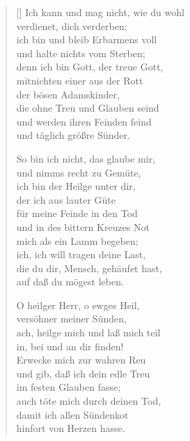 \begin{multicols}{2}
\begin{verse}[\versewidth]
 Ich kann und mag nicht, wie du wohl\\
verdienet, dich verderben;\\
ich bin und bleib Erbarmens voll\\
und halte nichts vom Sterben;\\
denn ich bin Gott, der treue Gott,\\
mitnichten einer aus der Rott\\
der bösen Adamskinder,\\
die ohne Treu und Glauben seind\\
und werden ihren Feinden feind\\
und täglich größre Sünder.

 So bin ich nicht, das glaube mir,\\
und nimms recht zu Gemüte,\\
ich bin der Heilge unter dir,\\
der ich aus lauter Güte\\
für meine Feinde in den Tod\\
und in des bittern Kreuzes Not\\
mich als ein Lamm begeben;\\
ich, ich will tragen deine Last,\\
die du dir, Mensch, gehäufet hast,\\
auf daß du mögest leben.

 O heilger Herr, o ewges Heil,\\
versöhner meiner Sünden,\\
ach, heilge mich und laß mich teil\\
in, bei und an dir finden!\\
Erwecke mich zur wahren Reu\\
und gib, daß ich dein edle Treu\\
im festen Glauben fasse;\\
auch töte mich durch deinen Tod,\\
damit ich allen Sündenkot\\
hinfort von Herzen hasse.

\end{verse}
\end{multicols}
